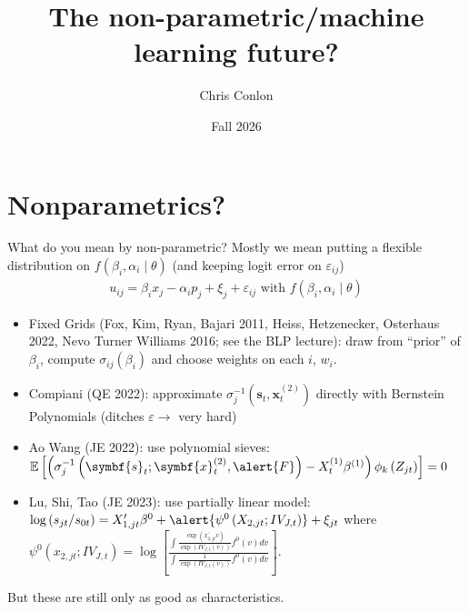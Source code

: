 \documentclass[aspectratio=169,10pt]{beamer}
\title{The non-parametric/machine learning future?}
\author{Chris Conlon}
\institute{NYU Stern}
\date{Fall 2026}
\begin{document}
\begin{frame}
\titlepage
\end{frame}


\section*{Nonparametrics?}


\begin{frame}{What do you mean by non-parametric?}
Mostly we mean putting a flexible distribution on $f(\beta_i,\alpha_i \mid \theta)$ (and keeping logit error on $\varepsilon_{ij}$)
\begin{align*}
u_{ij} = \beta_i x_j - \alpha_i p_j + \xi_j + \varepsilon_{ij} \text{ with } f(\beta_i,\alpha_i \mid \theta)
\end{align*}
\begin{itemize}
    \item Fixed Grids (Fox, Kim, Ryan, Bajari 2011, Heiss, Hetzenecker, Osterhaus 2022, Nevo Turner Williams 2016; see the BLP lecture): draw from ``prior'' of $\beta_i$, compute $\sigma_{ij}(\beta_i)$ and choose weights on each $i$, $w_i$.
    \item Compiani (QE 2022): approximate $\sigma_{j}^{-1}(\symbf{s}_t,\symbf{x}_t^{(2)})$ directly with Bernstein Polynomials (ditches $\varepsilon \rightarrow$ very hard)
    \item Ao Wang (JE 2022): use polynomial sieves: $\mathbb{E}\left[\left(\sigma_j^{-1}\left(\symbf{s}_t ; \symbf{x}_t^{(2)}, \alert{F}\right)-X_t^{(1)} \beta^{(1)}\right) \phi_k\left(Z_{j t}\right)\right]=0$
    \item Lu, Shi, Tao (JE 2023): use partially linear model: $\log \left(s_{j t} / s_{0 t}\right)=X_{1, j t}^{\prime} \beta^0+\alert{\psi^0\left(X_{2, j t} ; IV_{J, t}\right)}+\xi_{j t}$ where        $\psi^0\left(x_{2, j t} ; IV_{J, t}\right)=\log \left[\frac{\int \frac{\exp \left(x_{2, j t}^{\prime} v\right)}{\exp \left(IV_{J, t}(v)\right)} f^0(v) d v}{\int \frac{1}{\exp \left(IV_{J, t}(v)\right)} f^0(v) d v}\right]$.
\end{itemize}
But these are still \alert{only as good as characteristics}.
\end{frame}
\end{document}
